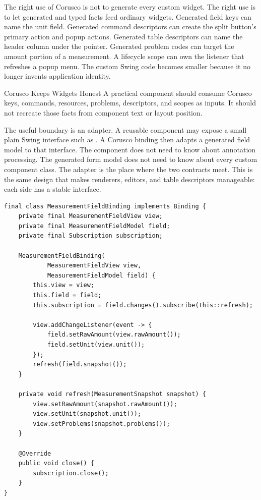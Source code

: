 The right use of Corusco is not to generate every custom widget. The right use is to let
generated and typed facts feed ordinary widgets. Generated field keys can name the unit
field. Generated command descriptors can create the split button's primary action and
popup actions. Generated table descriptors can name the header column under the pointer.
Generated problem codes can target the amount portion of a measurement. A lifecycle
scope can own the listener that refreshes a popup menu. The custom Swing code becomes
smaller because it no longer invents application identity.

\begin{principlebox}{Corusco Keeps Widgets Honest}
A practical component should consume Corusco keys, commands, resources, problems,
descriptors, and scopes as inputs. It should not recreate those facts from component
text or layout position.
\end{principlebox}

The useful boundary is an adapter. A reusable component may expose a small plain Swing
interface such as
. A Corusco
binding then adapts a generated field model to that interface. The component does not
need to know about annotation processing. The generated form model does not need to know
about every custom component class. The adapter is the place where the two contracts
meet. This is the same design that makes renderers, editors, and table descriptors
manageable: each side has a stable interface.

\begin{lstlisting}[caption={A custom field adapter connects Corusco state to Swing.}]
final class MeasurementFieldBinding implements Binding {
    private final MeasurementFieldView view;
    private final MeasurementFieldModel field;
    private final Subscription subscription;

    MeasurementFieldBinding(
            MeasurementFieldView view,
            MeasurementFieldModel field) {
        this.view = view;
        this.field = field;
        this.subscription = field.changes().subscribe(this::refresh);

        view.addChangeListener(event -> {
            field.setRawAmount(view.rawAmount());
            field.setUnit(view.unit());
        });
        refresh(field.snapshot());
    }

    private void refresh(MeasurementSnapshot snapshot) {
        view.setRawAmount(snapshot.rawAmount());
        view.setUnit(snapshot.unit());
        view.setProblems(snapshot.problems());
    }

    @Override
    public void close() {
        subscription.close();
    }
}
\end{lstlisting}

